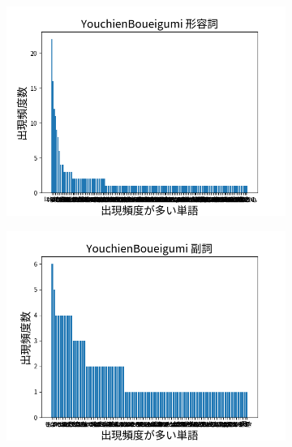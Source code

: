 \documentclass[onecolumn]{ujarticle}   %
\begin{document}
\begin{figure}[hb]
\begin{subfigure}{0.49\columnwidth}
			\includegraphics[width=1.0\columnwidth]{data/keiyosi_YouchienBoueigumi.png}
		\end{subfigure}
		\begin{subfigure}{0.49\columnwidth}
			\centering
			\includegraphics[width=1.0\columnwidth]{data/hukusi_YouchienBoueigumi.png}
		\end{subfigure}
		\begin{subfigure}{0.49\columnwidth}
			\centering

\end{subfigure}
\end{figure}
\end{document}

